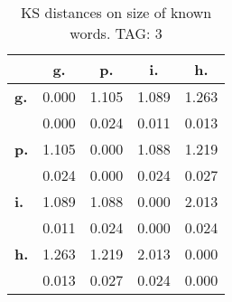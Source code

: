 \begin{table}[h!]
\begin{center}
\begin{tabular}{| l || c | c | c | c |}\hline
 & {\bf g.} & {\bf p.} & {\bf i.} & {\bf h.} \\\hline\hline
{\bf g.} & 0.000 & 1.105 & 1.089 & 1.263 \\
{\bf } & 0.000 & 0.024 & 0.011 & 0.013 \\\hline
{\bf p.} & 1.105 & 0.000 & 1.088 & 1.219 \\
{\bf } & 0.024 & 0.000 & 0.024 & 0.027 \\\hline
{\bf i.} & 1.089 & 1.088 & 0.000 & 2.013 \\
{\bf } & 0.011 & 0.024 & 0.000 & 0.024 \\\hline
{\bf h.} & 1.263 & 1.219 & 2.013 & 0.000 \\
{\bf } & 0.013 & 0.027 & 0.024 & 0.000 \\\hline
\end{tabular}
\caption{KS distances on size of known words. TAG: 3}
\end{center}
\end{table}